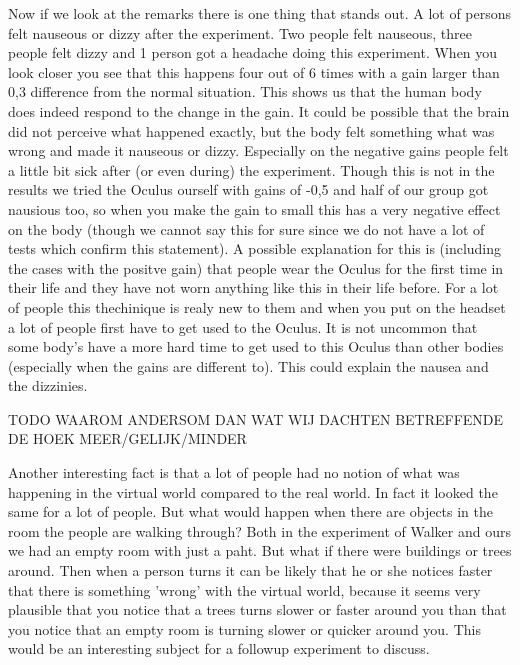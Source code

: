 Now if we look at the remarks there is one thing that stands out. 
A lot of persons felt nauseous or dizzy after the experiment. 
Two people felt nauseous, three people felt dizzy and 1 person got a headache doing this experiment. 
When you look closer you see that this happens four out of 6 times with a gain larger than 0,3 difference from the normal situation. 
This shows us that the human body does indeed respond to the change in the gain. 
It could be possible that the brain did not perceive what happened exactly, but the body felt something what was wrong and made it nauseous or dizzy. 
Especially on the negative gains people felt a little bit sick after (or even during) the experiment. 
Though this is not in the results we tried the Oculus ourself with gains of -0,5 and half of our group got nausious too, so when you make the gain to small this has a very negative effect on the body (though we cannot say this for sure since we do not have a lot of tests which confirm this statement). 
A possible explanation for this is (including the cases with the positve gain) that people wear the Oculus for the first time in their life and they have not worn anything like this in their life before. 
For a lot of people this thechinique is realy new to them and when you put on the headset a lot of people first have to get used to the Oculus. 
It is not uncommon that some body's have a more hard time to get used to this Oculus than other bodies (especially when the gains are different to). 
This could explain the nausea and the dizzinies.

TODO WAAROM ANDERSOM DAN WAT WIJ DACHTEN BETREFFENDE DE HOEK MEER/GELIJK/MINDER

Another interesting fact is that a lot of people had no notion of what was happening in the virtual world compared to the real world.
In fact it looked the same for a lot of people. But what would happen when there are objects in the room the people are walking through? 
Both in the experiment of Walker \cite{jwalker} and ours we had an empty room with just a paht. 
But what if there were buildings or trees around. 
Then when a person turns it can be likely that he or she notices faster that there is something 'wrong'  with the virtual world, because it seems very plausible that you notice that a trees turns slower or faster around you than that you notice that an empty room is turning slower or quicker around you. 
This would be an interesting subject for a followup experiment to discuss.
